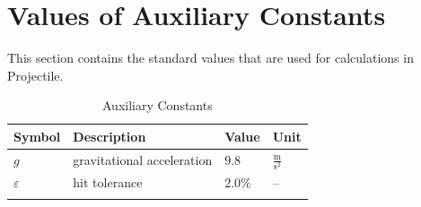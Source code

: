 \documentclass[12pt]{article}
\begin{document}
\section{Values of Auxiliary Constants}
\label{Sec:AuxConstants}
This section contains the standard values that are used for calculations in Projectile.
\begin{longtable}{l l l l}
\toprule
Symbol & Description & Value & Unit
\\
\midrule
\endhead
$g$ & gravitational acceleration & $9.8$ & $\frac{\text{m}}{\text{s}^{2}}$
\\
$ε$ & hit tolerance & $2.0\%$ & --
\\
\bottomrule
\caption{Auxiliary Constants}
\label{Table:TAuxConsts}
\end{longtable}
\end{document}
